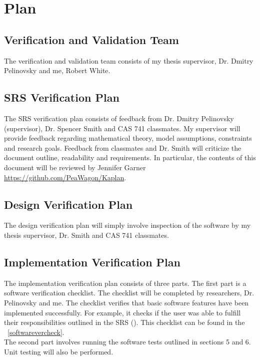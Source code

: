 \documentclass[12pt, titlepage]{article}
\begin{document}
\section{Plan}
	 
\subsection{Verification and Validation Team}
\label{VnVTeam}
The verification and validation team consists of my thesis supervisor, Dr. 
Dmitry Pelinovsky and me, Robert White. \\

\subsection{SRS Verification Plan}
\label{SRSVerPlan}
The SRS verification plan consists of feedback from Dr. Dmitry Pelinovsky 
(supervisor), Dr. Spencer Smith and CAS 741 classmates. My supervisor will 
provide feedback regarding mathematical theory, model assumptions, constraints 
and research goals. Feedback from classmates and Dr. Smith will criticize the 
document outline, readability and requirements. In particular, the contents of 
this document will be reviewed by Jennifer Garner 
\url{https://github.com/PeaWagon/Kaplan}. 

\subsection{Design Verification Plan}
\label{DesignVerificationPlan}
The design verification plan will simply involve inspection of the software by 
my thesis supervisor, Dr$.$ Smith and CAS 741 classmates.  

\subsection{Implementation Verification Plan}
\label{ImplementationVerPlan}
The implementation verification plan consists of three parts. The first part 
is a software verification checklist. The checklist will be completed by 
researchers, Dr$.$ Pelinovsky and me. The checklist verifies that basic 
software features have been implemented successfully. 
For example, it checks if the user was able to fulfill their responsibilities 
outlined in the SRS (\cite{SRS}). 
This checklist can be found in the ~\ref{softwarevercheck}.\\

 The second part involves running the software tests outlined in sections 5 and 
 6. Unit testing will also be performed. \\
 
\end{document}
